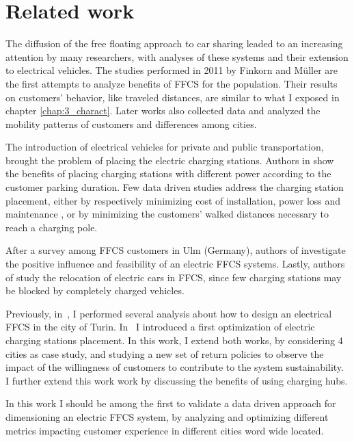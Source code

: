 \section{Related work}
\label{sec:6_2_related}

The diffusion of the free floating approach to car sharing leaded to an increasing attention by many researchers, with  analyses of
these systems and their extension to electrical vehicles. 
The studies performed  in 2011 by Finkorn and M\"{u}ller \cite{Firnkorn2011,FM12} are the first attempts to analyze benefits of FFCS for the population. Their results on customers' behavior, like traveled distances, are similar to what I exposed in chapter \ref{chap:3_charact}.
Later works \cite{Car2GoGlobalAnalysis,CSandSocial,Schmoller2015} also collected data and analyzed the mobility patterns of customers and differences among cities.

The introduction of electrical vehicles for private and public transportation, brought the problem of placing the electric charging stations. Authors in \cite{ChargingStationForVehicularNetworks} show the benefits of placing charging stations with different power according to the customer parking duration. 
Few data driven studies address the charging station placement, either by respectively minimizing  cost of installation, power loss and maintenance  \cite{PlacementAndPowergrid,mipCSPpechino}, or by minimizing the customers' walked distances necessary to reach a charging pole\cite{placementAustin}. 

After a survey among FFCS customers in Ulm (Germany), authors of \cite{FM15}  investigate the positive influence and feasibility of an electric FFCS systems.
Lastly, authors of \cite{WB15} study the relocation of electric cars in FFCS, since few charging stations may be blocked by completely charged vehicles. 

Previously, in~\cite{taormina}, I performed several analysis about how to design an electrical FFCS in the city of Turin. In~\cite{maui} I introduced a first optimization of electric charging stations placement. In this work, I extend both works, by considering 4 cities as case study, and studying a new set of return policies to observe the impact of the willingness of customers to contribute to the system sustainability. I further extend this work work by discussing the benefits of using charging hubs.

In this work I should be among the first to validate a data driven approach for dimensioning an electric FFCS system, by analyzing and optimizing different metrics impacting customer experience in different cities word wide located.

